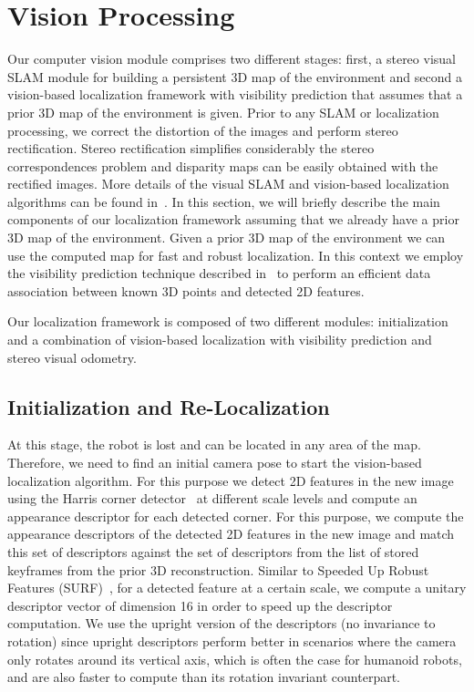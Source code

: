 
\section{Vision Processing}\label{sec:vision}
Our computer vision module comprises two different stages: first, a stereo visual SLAM module for building a persistent 3D map of the environment and second a vision-based localization framework with visibility prediction that assumes that a prior 3D map of the environment is given. Prior to any SLAM or localization processing, we correct the distortion of the images and perform stereo rectification. Stereo rectification simplifies considerably the stereo correspondences problem and disparity maps can be easily obtained with the rectified images. More details of the visual SLAM and vision-based localization algorithms can be found in~\cite{Alcantarilla12auro}. In this section, we will briefly describe the main components of our localization framework assuming that we already have a prior 3D map of the environment. Given a prior 3D map of the environment we can use the computed map for fast and robust localization. In this context we employ the visibility prediction technique described in~\cite{Alcantarilla11icra,Alcantarilla12auro} to perform an efficient data association between known 3D points and detected 2D features.

Our localization framework is composed of two different modules: initialization and a combination of vision-based
localization with visibility prediction and stereo visual odometry.

\subsection{Initialization and Re-Localization}
At this stage, the robot is lost and can be located in any area of the map. Therefore, we need to find an initial camera pose to start the
vision-based localization algorithm. For this purpose we detect 2D features in the new image using the Harris corner detector~\cite{Harris88avc} at different scale levels and compute an appearance descriptor for each detected corner. For this purpose, we compute the appearance descriptors of the detected 2D features in the new image and match this set of descriptors against the set of descriptors from the list of stored keyframes from the prior 3D reconstruction. Similar to Speeded Up Robust Features (SURF)~\cite{Bay08cviu}, for a detected feature at a certain scale, we compute a unitary descriptor vector of dimension 16 in order to speed up the descriptor computation. We use the upright version of the descriptors (no invariance to rotation) since upright descriptors perform better in scenarios where the camera only rotates around its vertical axis, which is often the case for humanoid robots, and are also faster to compute than its rotation invariant counterpart.

